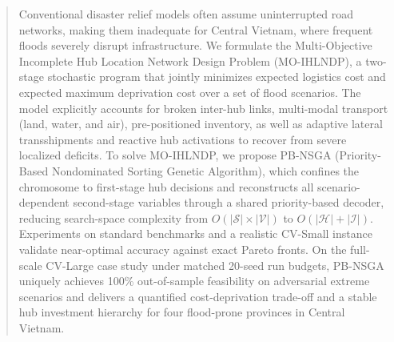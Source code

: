 \documentclass{llncs}
\begin{document}
\begin{abstract}

Conventional disaster relief models often assume uninterrupted road networks, making them inadequate for Central Vietnam, where frequent floods severely disrupt infrastructure.
We formulate the Multi-Objective Incomplete Hub Location Network Design Problem (MO-IHLNDP), a two-stage stochastic program that jointly minimizes expected logistics cost and expected maximum deprivation cost over a set of flood scenarios. The model explicitly accounts for broken inter-hub links, multi-modal transport (land, water, and air), pre-positioned inventory, as well as adaptive lateral transshipments and reactive hub activations to recover from severe localized deficits.
To solve MO-IHLNDP, we propose PB-NSGA (Priority-Based Nondominated Sorting Genetic Algorithm), which confines the chromosome to first-stage hub decisions and reconstructs all scenario-dependent second-stage variables through a shared priority-based decoder, reducing search-space complexity from $O(|\mathcal{S}|\times|\mathcal{V}|)$ to $O(|\mathcal{H}| + |\mathcal{I}|)$.
Experiments on standard benchmarks and a realistic CV-Small instance validate near-optimal accuracy against exact Pareto fronts. On the full-scale CV-Large case study under matched 20-seed run budgets, PB-NSGA uniquely achieves 100\% out-of-sample feasibility on adversarial extreme scenarios and delivers a quantified cost-deprivation trade-off and a stable hub investment hierarchy for four flood-prone provinces in Central Vietnam.

\end{abstract}
\end{document}
